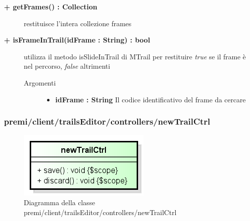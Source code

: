 \begin{description}
	\begin{description}
		\item[\textbf{\color{blue}+ getFrames() : Collection		}] \hfill
			restituisce l'intera collezione frames
	\end{description}
	
	
	\begin{description}
		\item[\textbf{\color{blue}+ isFrameInTrail(idFrame : String) : bool			}] \hfill
			utilizza il metodo isSlideInTrail di MTrail per restituire \textit{true} se il frame è nel percorso, \textit{false} altrimenti
			
		\begin{description}
			\item[Argomenti] \hfill
				\begin{itemize}
				
					\item \textbf{idFrame : String			} \hfill
					Il codice identificativo del frame da cercare
					
				\end{itemize}
			
		\end{description}
	\end{description}
	
\end{description}	
	
	
	
	
	
	
	
	
	
	
\subsubsection{premi/client/trailsEditor/controllers/newTrailCtrl}
\begin{figure}[H]
\begin{center}
\includegraphics[scale=0.95]{img/diacla/newTrailCtrl.png}
\caption{Diagramma della classe premi/client/trailsEditor/controllers/newTrailCtrl}
\end{center}
\end{figure}


